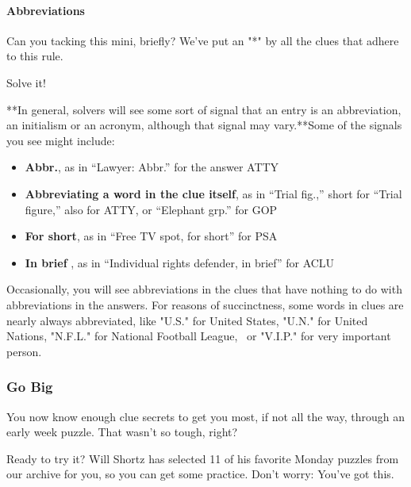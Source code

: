 \begin{itemize}
{  \paragraph{Abbreviations}\label{abbreviations}}

  Can you tacking this mini, briefly? We've put an "*" by all the clues
  that adhere to this rule.

  Solve it!

  **In general, solvers will see some sort of signal that an entry is an
  abbreviation, an initialism or an acronym, although that signal may
  vary.**Some of the signals you see might include:

  \begin{itemize}
  \tightlist
  \item
    \textbf{Abbr.}, as in ``Lawyer: Abbr.'' for the answer ATTY
  \item
    \textbf{Abbreviating a word in the clue itself}, as in ``Trial
    fig.,'' short for ``Trial figure,'' also for ATTY, or ``Elephant
    grp.'' for GOP
  \item
    \textbf{For short}, as in ``Free TV spot, for short'' for PSA
  \item
    \textbf{In brief} , as in ``Individual rights defender, in brief''
    for ACLU
  \end{itemize}

  Occasionally, you will see abbreviations in the clues that have
  nothing to do with abbreviations in the answers. For reasons of
  succinctness, some words in clues are nearly always abbreviated, like
  "U.S." for United States, "U.N." for United Nations, "N.F.L." for
  National Football League, ~or "V.I.P." for very important person.
\end{itemize}

\hypertarget{go-big}{%
\subsubsection{Go Big}\label{go-big}}

You now know enough clue secrets to get you most, if not all the way,
through an early week puzzle. That wasn't so tough, right?

Ready to try it? Will Shortz has selected 11 of his favorite Monday
puzzles from our archive for you, so you can get some practice. Don't
worry: You've got this.~

\href{https://www.nytimes.com/interactive/2017/02/14/cricticschoice/crosswords/remarkable-puzzles-will-shortz.html?_r=0}{}

